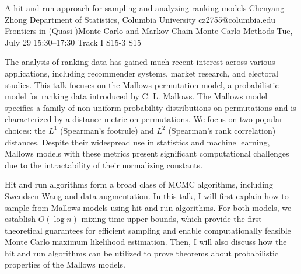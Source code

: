 \begin{talk}
  {A hit and run approach for sampling and analyzing ranking models}%
  {Chenyang Zhong}%
  {Department of Statistics, Columbia University}%
  {cz2755@columbia.edu}%
  {Frontiers in (Quasi-)Monte Carlo and Markov Chain Monte Carlo Methods}%
  {}%
  {Tue, July 29 15:30–17:30 Track I}%
  {S15-3}%
  {S15}%
				
			
The analysis of ranking data has gained much recent interest across various applications, including recommender systems, market research, and electoral studies. This talk focuses on the Mallows permutation model, a probabilistic model for ranking data introduced by C. L. Mallows. The Mallows model specifies a family of non-uniform probability distributions on permutations and is characterized by a distance metric on permutations. We focus on two popular choices: the $L^1$ (Spearman’s footrule) and $L^2$ (Spearman’s rank correlation) distances. Despite their widespread use in statistics and machine learning, Mallows models with these metrics present significant computational challenges due to the intractability of their normalizing constants.

Hit and run algorithms form a broad class of MCMC algorithms, including Swendsen-Wang and data augmentation. In this talk, I will first explain how to sample from Mallows models using hit and run algorithms. For both models, we establish $O(\log n)$ mixing time upper bounds, which provide the first theoretical guarantees for efficient sampling and enable computationally feasible Monte Carlo maximum likelihood estimation. Then, I will also discuss how the hit and run algorithms can be utilized to prove theorems about probabilistic properties of the Mallows models.

\medskip


\end{talk}

